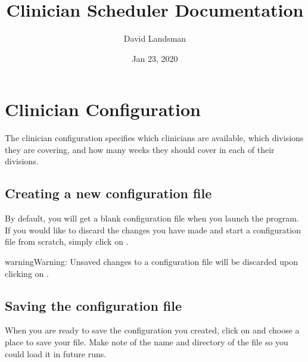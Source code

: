 \documentclass[letterpaper,10pt,english]{sphinxmanual}
\title{Clinician Scheduler Documentation}
\date{Jan 23, 2020}
\author{David Landsman}
\begin{document}
\pagestyle{empty}
\sphinxmaketitle
\pagestyle{plain}
\sphinxtableofcontents
\pagestyle{normal}
\label{\detokenize{manual::doc}}



\chapter{Clinician Configuration}
\label{\detokenize{manual:clinician-configuration}}\label{\detokenize{manual:id1}}
The clinician configuration specifies which clinicians are available,
which divisions they are covering, and how many weeks they should cover
in each of their divisions.


\section{Creating a new configuration file}
\label{\detokenize{manual:creating-a-new-configuration-file}}
By default, you will get a blank configuration file when you launch
the program. If you would like to discard the changes you have made and
start a configuration file from scratch, simply click on .

\begin{figure}[H]
\centering

\end{figure}

\begin{sphinxadmonition}{warning}{Warning:}
Unsaved changes to a configuration file will be discarded upon clicking
on .
\end{sphinxadmonition}


\section{Saving the configuration file}
\label{\detokenize{manual:saving-the-configuration-file}}
When you are ready to save the configuration you created, click on
 and choose a place to save your file. Make note of the name
and directory of the file so you could load it in future runs.

\begin{figure}[H]
\centering

\end{figure}
\end{document}
